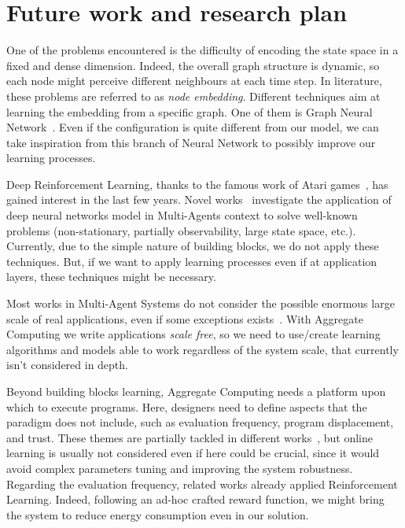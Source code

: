 \documentclass[conference]{IEEEtran}
\begin{document}
\section{Future work and research plan}
One of the problems encountered is the difficulty of encoding the state space in a fixed and dense dimension. Indeed, the overall graph structure is dynamic, so each node might perceive different neighbours at each time step.
In literature, these problems are referred to as \emph{node embedding}. Different techniques aim at learning the embedding from a specific graph. One of them is Graph Neural Network~\cite{DBLP:journals/tnn/ScarselliGTHM09}.
Even if the configuration is quite different from our model, we can take inspiration from this branch of Neural Network to possibly improve our learning processes.

Deep Reinforcement Learning, thanks to the famous work of Atari games~\cite{DBLP:journals/corr/HosuR16}, has gained interest in the last few years. Novel works~\cite{DBLP:journals/aamas/Hernandez-LealK19} investigate the application of deep neural networks model in Multi-Agents context
to solve well-known problems (non-stationary, partially observability, large state space, etc.). Currently, due to the simple nature of building blocks, we do not apply these techniques. But, if we want to apply learning processes even if
at application layers, these techniques might be necessary.

Most works in Multi-Agent Systems do not consider the possible enormous large scale of real applications, even if some exceptions exists~\cite{nguyen2018reinforcement}. With Aggregate Computing we write applications \emph{scale free}, so we need to use/create learning algorithms and models able to work
regardless of the system scale, that currently isn't considered in depth.

Beyond building blocks learning, Aggregate Computing needs a platform upon which to execute programs. 
Here, designers need to define aspects that the paradigm does not include, 
such as evaluation frequency, program displacement, and trust. 
These themes are partially tackled in different works~\cite{DBLP:journals/scp/CasadeiAV18, DBLP:journals/fi/CasadeiPPVW20, DBLP:journals/corr/abs-2012-13806}, 
but online learning is usually not considered even if here could be crucial, 
since it would avoid complex parameters tuning and improving the system robustness.
Regarding the evaluation frequency, related works already applied Reinforcement Learning. 
Indeed, following an ad-hoc crafted reward function, we might bring the system to reduce energy consumption even in our solution.
\end{document}
